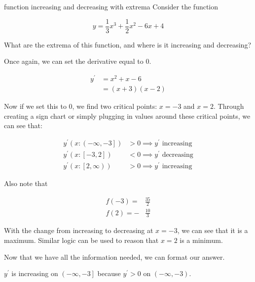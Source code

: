 \begin{example}{function increasing and decreasing with extrema}
    Consider the function
    
    \[ y = \dfrac{1}{3}x^3 + \dfrac{1}{2}x^2 - 6x + 4 \]
    
    What are the extrema of this function, and where is it increasing and decreasing?
    
    \vspace{0.3cm}
    
    Once again, we can set the derivative equal to \( 0 \).
    
    \begin{align}
        y^\prime &= x^2 + x - 6 \\
        &= \left( x + 3 \right) \left( x - 2 \right)
    \end{align}
    
    Now if we set this to \( 0 \), we find two critical points: \( x = -3 \) and \( x = 2 \). Through creating a sign chart or simply plugging in values around these critical points, we can see that:
    
    \begin{align}
        y^\prime \left( x : \left( -\infty, -3 \right] \right) &> 0 \implies y^\prime \text{ increasing} \\
        y^\prime \left( x : \left[ -3, 2 \right] \right) &< 0 \implies y^\prime \text{ decreasing} \\
        y^\prime \left( x : \left[ 2, \infty \right) \right) &> 0 \implies y^\prime \text{ increasing}
    \end{align}
    
    Also note that
    
    \begin{align}
        f \left( -3 \right) = &\frac{35}{2} \\
        f \left( 2 \right) = -&\frac{10}{3}
    \end{align}
    
    With the change from increasing to decreasing at \( x = -3 \), we can see that it is a maximum. Similar logic can be used to reason that \( x = 2 \) is a minimum.
    
    Now that we have all the information needed, we can format our answer.
    
    \begin{center}
        \( y^\prime \) is increasing on \( \left( -\infty, -3 \right] \) because \( y^\prime > 0 \) on \( \left( -\infty, -3 \right) \).
        

\end{center}
\end{example}
